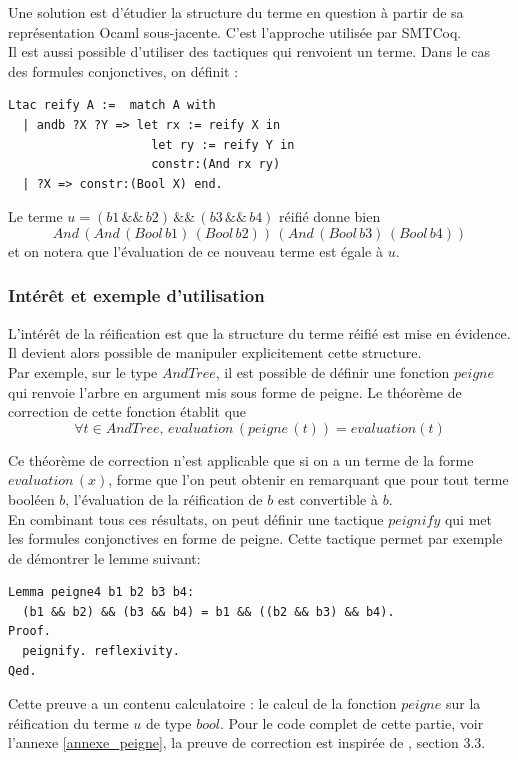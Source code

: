 \documentclass[11pt]{article}
\begin{document}
Une solution est d'étudier la structure du terme en question à partir de sa représentation Ocaml sous-jacente. C'est l'approche utilisée par SMTCoq. \\

Il est aussi possible d'utiliser des tactiques qui renvoient un terme. Dans le cas des formules conjonctives, on définit :

\begin{lstlisting}[frame=single]
Ltac reify A :=  match A with
  | andb ?X ?Y => let rx := reify X in
                    let ry := reify Y in
                    constr:(And rx ry)
  | ?X => constr:(Bool X) end.

\end{lstlisting}

Le terme $u = (b1\,\&\&\,b2)\,\&\&\,(b3\,\&\&\,b4)$ réifié donne bien 
\[And\,(And\,(Bool\,b1)\,(Bool\,b2))\,(And\,(Bool\,b3)\,(Bool\,b4))\] 
et on notera que l'évaluation de ce nouveau terme est égale à $u$.



\subsubsection{Intérêt et exemple d'utilisation} \label{interet_reification}

L'intérêt de la réification est que la structure du terme réifié est mise en évidence. Il devient alors possible de manipuler explicitement cette structure. \\

Par exemple, sur le type $AndTree$, il est possible de définir une fonction $peigne$ qui renvoie l'arbre en argument mis sous forme de peigne. Le théorème de correction de cette fonction établit que 
\[ \forall t \in AndTree, \, evaluation \, (peigne \, (t)) = evaluation (t) \]

Ce théorème de correction n'est applicable que si on a un terme de la forme $evaluation \, (x)$, forme que l'on peut obtenir en remarquant que pour tout terme booléen $b$, l'évaluation de la réification de $b$ est convertible à $b$.\\

En combinant tous ces résultats, on peut définir une tactique $peignify$ qui met les formules conjonctives en forme de peigne. Cette tactique permet par exemple de démontrer le lemme suivant: 

\begin{lstlisting}[frame=single]
Lemma peigne4 b1 b2 b3 b4:
  (b1 && b2) && (b3 && b4) = b1 && ((b2 && b3) && b4).
Proof.
  peignify. reflexivity.
Qed.
\end{lstlisting}
Cette preuve a un contenu calculatoire : le calcul de la fonction $peigne$ sur la réification du terme $u$ de type $bool$. Pour le code complet de cette partie, voir l'annexe \ref{annexe_peigne}, la preuve de correction est inspirée de \cite{coq_intro}, section 3.3.
\end{document}
